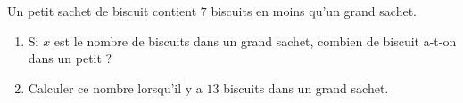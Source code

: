 
\begin{exercice}\label{exo2smath-0227}

    Un petit sachet de biscuit contient \( 7\) biscuits en moins qu'un grand sachet. 
    \begin{enumerate}
        \item
            Si \( x\) est le nombre de biscuits dans un grand sachet, combien de biscuit a-t-on dans un petit ?
        \item
            Calculer ce nombre lorsqu'il y a \( 13\) biscuits dans un grand sachet.
    \end{enumerate}

\end{exercice}
